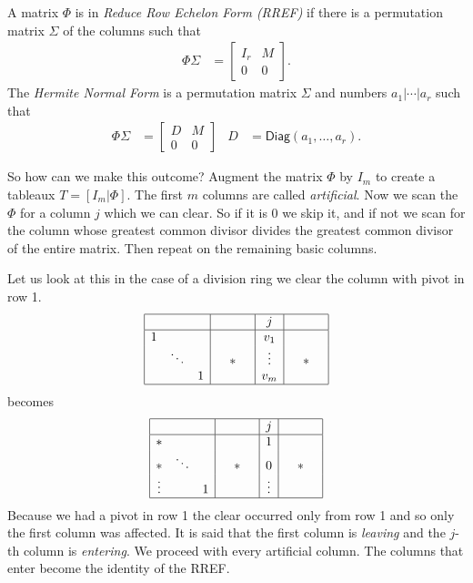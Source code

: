 \documentclass[12pt,twoside,dvipsnames,letterpaper]{memoir}
\begin{document}
\begin{definition}
    A matrix $\Phi$ is in \emph{Reduce Row Echelon Form (RREF)}
    if there is a permutation matrix $\Sigma$ of the columns such 
    that 
    \begin{align*}
        \Phi\Sigma & = \begin{bmatrix}
            I_r & M \\
            0 & 0 
        \end{bmatrix}.
    \end{align*}
    The \emph{Hermite Normal Form} is a permutation matrix 
    $\Sigma$ and numbers $a_1|\cdots |a_r$ such that 
    \begin{align*}
        \Phi\Sigma & = \begin{bmatrix}
            D & M \\
            0 & 0 
        \end{bmatrix}
        & 
        D & = \mathsf{Diag}(a_1,\ldots,a_r).
    \end{align*}
\end{definition}


So how can we make this outcome?  
Augment the matrix $\Phi$ by $I_m$ to create a tableaux
$T=[I_m | \Phi]$.  
The first $m$ columns are called \emph{artificial}.
Now we scan the $\Phi$ for 
a column $j$ which we can clear.  So if it is $0$ we skip it, 
and if not we scan for the column whose greatest common 
divisor divides the greatest common divisor of the entire matrix.
Then repeat on the remaining basic columns.

Let us look at this in the case of a division ring
we clear the column with pivot in row 1.
\begin{align*}
    \begin{array}{|ccc|ccc|c|ccc|}
        \hline
        & & &  && & j & & & \\
        \hline 
        1 & & & & & & v_1 &  & & \\
        & \ddots & & &  *  & & \vdots & & * & \\
        & & 1 & & & &v_m & & & \\
        \hline
    \end{array}
\end{align*}
becomes
\begin{align*}
    \begin{array}{|ccc|ccc|c|ccc|}
        \hline
        & & &  && & j & & & \\
        \hline 
        * & & & & & & 1 &  & & \\
        * & \ddots & & &  *  & & 0 & & * & \\
        \vdots & & 1 & & & & \vdots & & & \\
        \hline
    \end{array}
\end{align*}
Because we had a pivot in row 1 the clear occurred only from row 1
and so only the first column was affected.  It is said that the 
first column is \emph{leaving} and the $j$-th column is \emph{entering}.
We proceed with every artificial column.  The columns that enter 
become the identity of the RREF.
\end{document}

